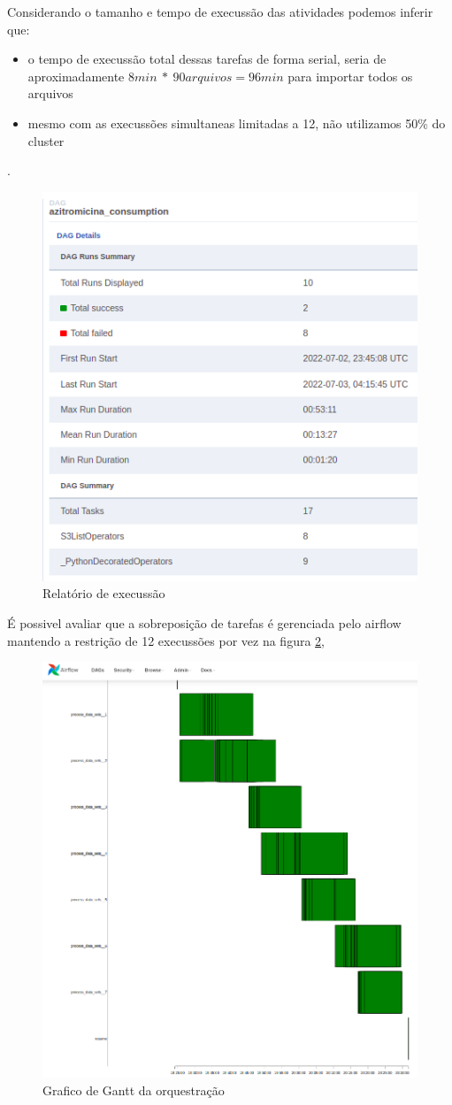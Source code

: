 Considerando o tamanho e tempo de execussão das atividades podemos inferir que:
\begin{itemize}
    \item o tempo de execussão total dessas tarefas de forma serial, seria de aproximadamente $8 min\ *\ 90 arquivos = 96min$ para importar todos os arquivos
    \item mesmo com as execussões simultaneas limitadas a 12, não utilizamos 50\% do cluster
\end{itemize} . 


\begin{figure}[!ht]
    \centering
    \includegraphics[width=0.5\linewidth]{04-figuras/report_execution_summary1.png}
    \caption{Relatório de execussão}
    \label{fig:report}
\end{figure}

É possivel avaliar que a sobreposição de tarefas é gerenciada pelo airflow mantendo a restrição de 12 execussões por vez na figura \ref{fig:gantt},

\begin{figure}[!ht]
    \centering
    \includegraphics[width=0.7\linewidth]{04-figuras/gantt.png}
    \caption{Grafico de Gantt da orquestração}
    \label{fig:gantt}
\end{figure}

